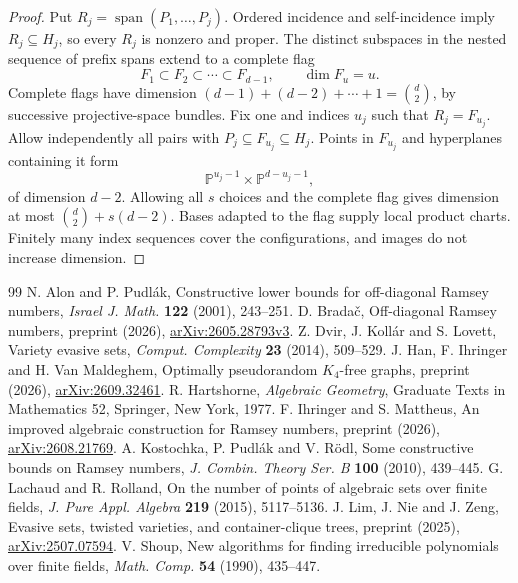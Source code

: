 \documentclass[11pt,a4paper]{article}
\newcommand{\PP}{\mathbb P}
\DeclareMathOperator{\spanop}{span}
\theoremstyle{definition}
\theoremstyle{remark}
\numberwithin{equation}{section}
\begin{document}
\begin{proof}
Put $R_j=\spanop(P_1,\ldots,P_j)$. Ordered incidence and self-incidence imply $R_j\subseteq H_j$, so every $R_j$ is nonzero and proper. The distinct subspaces in the nested sequence of prefix spans extend to a complete flag
\[
F_1\subset F_2\subset\cdots\subset F_{d-1},\qquad\dim F_u=u.
\]
Complete flags have dimension $(d-1)+(d-2)+\cdots+1=\binom d2$, by successive projective-space bundles. Fix one and indices $u_j$ such that $R_j=F_{u_j}$. Allow independently all pairs with $P_j\subseteq F_{u_j}\subseteq H_j$. Points in $F_{u_j}$ and hyperplanes containing it form
\[
\PP^{u_j-1}\times\PP^{d-u_j-1},
\]
of dimension $d-2$. Allowing all $s$ choices and the complete flag gives dimension at most $\binom d2+s(d-2)$. Bases adapted to the flag supply local product charts. Finitely many index sequences cover the configurations, and images do not increase dimension.
\end{proof}

\begin{thebibliography}{99}
 N. Alon and P. Pudl\'ak, Constructive lower bounds for off-diagonal Ramsey numbers, \emph{Israel J. Math.} \textbf{122} (2001), 243--251.
 D. Brada\v{c}, Off-diagonal Ramsey numbers, preprint (2026), \href{https://arxiv.org/abs/2605.28793v3}{arXiv:2605.28793v3}.
 Z. Dvir, J. Koll\'ar and S. Lovett, Variety evasive sets, \emph{Comput. Complexity} \textbf{23} (2014), 509--529.
 J. Han, F. Ihringer and H. Van Maldeghem, Optimally pseudorandom $K_4$-free graphs, preprint (2026), \href{https://arxiv.org/abs/2609.32461}{arXiv:2609.32461}.
 R. Hartshorne, \emph{Algebraic Geometry}, Graduate Texts in Mathematics 52, Springer, New York, 1977.
 F. Ihringer and S. Mattheus, An improved algebraic construction for Ramsey numbers, preprint (2026), \href{https://arxiv.org/abs/2608.21769}{arXiv:2608.21769}.
 A. Kostochka, P. Pudl\'ak and V. R\"odl, Some constructive bounds on Ramsey numbers, \emph{J. Combin. Theory Ser. B} \textbf{100} (2010), 439--445.
 G. Lachaud and R. Rolland, On the number of points of algebraic sets over finite fields, \emph{J. Pure Appl. Algebra} \textbf{219} (2015), 5117--5136.
 J. Lim, J. Nie and J. Zeng, Evasive sets, twisted varieties, and container-clique trees, preprint (2025), \href{https://arxiv.org/abs/2507.07594}{arXiv:2507.07594}.
 V. Shoup, New algorithms for finding irreducible polynomials over finite fields, \emph{Math. Comp.} \textbf{54} (1990), 435--447.
\end{thebibliography}
\end{document}
